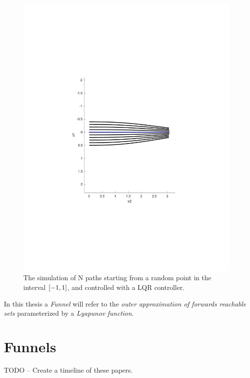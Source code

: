 \begin{figure}
  \includegraphics[scale=.5]{figures/preliminaries/montecarlofunnel}
  \caption{The simulation of N paths starting from a random point in the
    interval \(\lbrack-1,1\rbrack\), and controlled with a LQR controller.}
\end{figure}

In this thesis a \textit{Funnel} will refer to the \textit{outer approximation
  of forwards reachable sets} parameterized by a \textit{Lyapunov function}.


\section{Funnels}
\label{sec:Funnels}

TODO -- Create a timeline of these papers.

